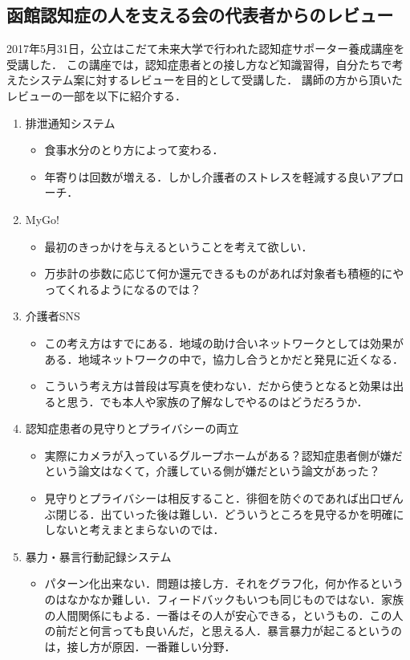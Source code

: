 \documentclass[../report]{subfiles}
\begin{document}
\subsection{函館認知症の人を支える会の代表者からのレビュー}
2017年5月31日，公立はこだて未来大学で行われた認知症サポーター養成講座を受講した．
この講座では，認知症患者との接し方など知識習得，自分たちで考えたシステム案に対するレビューを目的として受講した．
講師の方から頂いたレビューの一部を以下に紹介する．
\begin{enumerate}
    \item 排泄通知システム
        \begin{itemize}
            \item 食事水分のとり方によって変わる．
            \item 年寄りは回数が増える．しかし介護者のストレスを軽減する良いアプローチ．
        \end{itemize}
    \item MyGo!
        \begin{itemize}
            \item 最初のきっかけを与えるということを考えて欲しい．
            \item 万歩計の歩数に応じて何か還元できるものがあれば対象者も積極的にやってくれるようになるのでは？
        \end{itemize}
    \item 介護者SNS
        \begin{itemize}
            \item この考え方はすでにある．地域の助け合いネットワークとしては効果がある．地域ネットワークの中で，協力し合うとかだと発見に近くなる．
            \item こういう考え方は普段は写真を使わない．だから使うとなると効果は出ると思う．でも本人や家族の了解なしでやるのはどうだろうか．
        \end{itemize}
    \item 認知症患者の見守りとプライバシーの両立
        \begin{itemize}
            \item 実際にカメラが入っているグループホームがある？認知症患者側が嫌だという論文はなくて，介護している側が嫌だという論文があった？
            \item 見守りとプライバシーは相反すること．徘徊を防ぐのであれば出口ぜんぶ閉じる．出ていった後は難しい．どういうところを見守るかを明確にしないと考えまとまらないのでは．
        \end{itemize}
    \item 暴力・暴言行動記録システム
        \begin{itemize}
            \item パターン化出来ない．問題は接し方．それをグラフ化，何か作るというのはなかなか難しい．フィードバックもいつも同じものではない．家族の人間関係にもよる．一番はその人が安心できる，というもの．この人の前だと何言っても良いんだ，と思える人．暴言暴力が起こるというのは，接し方が原因．一番難しい分野．
        \end{itemize}
\end{enumerate}
\end{document}
